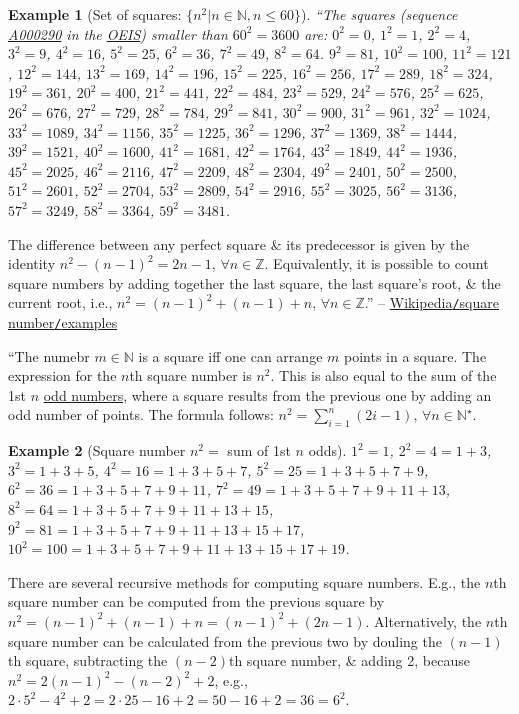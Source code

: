 \documentclass{article}
\newtheorem{example}{Example}
\begin{document}
\begin{example}[Set of squares: $\{n^2|n\in\mathbb{N},n\le60\}$]
	``The squares (sequence \href{https://oeis.org/A000290}{A000290} in the \href{https://en.wikipedia.org/wiki/On-Line_Encyclopedia_of_Integer_Sequences}{OEIS}) smaller than $60^2 = 3600$ are: $0^2 = 0$, $1^2 = 1$, $2^2 = 4$, $3^2 = 9$, $4^2 = 16$, $5^2 = 25$, $6^2 = 36$, $7^2 = 49$, $8^2 = 64$. $9^2 = 81$, $10^2 = 100$, $11^2 = 121$, $12^2 = 144$, $13^2 = 169$, $14^2 = 196$, $15^2 = 225$, $16^2 = 256$, $17^2 = 289$, $18^2 = 324$, $19^2 = 361$, $20^2 = 400$, $21^2 = 441$, $22^2 = 484$, $23^2 = 529$, $24^2 = 576$, $25^2 = 625$, $26^2 =  676$, $27^2 = 729$, $28^2 = 784$, $29^2 = 841$, $30^2 = 900$, $31^2 = 961$, $32^2 = 1024$, $33^2 = 1089$, $34^2 = 1156$, $35^2 = 1225$, $36^2 = 1296$, $37^2 = 1369$, $38^2 = 1444$, $39^2 = 1521$, $40^2 = 1600$, $41^2 = 1681$, $42^2 = 1764$, $43^2 = 1849$, $44^2 = 1936$, $45^2 = 2025$, $46^2 = 2116$, $47^2 = 2209$, $48^2 = 2304$, $49^2 = 2401$, $50^2 = 2500$, $51^2 = 2601$, $52^2 = 2704$, $53^2 = 2809$, $54^2 = 2916$, $55^2 = 3025$, $56^2 = 3136$, $57^2 = 3249$, $58^2 = 3364$, $59^2 = 3481$.
\end{example}
The difference between any perfect square \& its predecessor is given by the identity $n^2 - (n - 1)^2 = 2n - 1$, $\forall n\in\mathbb{Z}$. Equivalently, it is possible to count square numbers by adding together the last square, the last square's root, \& the current root, i.e., $n^2 = (n - 1)^2 + (n - 1) + n$, $\forall n\in\mathbb{Z}$.'' -- \href{https://en.wikipedia.org/wiki/Square_number#Examples}{Wikipedia{\tt/}square number{\tt/}examples}

``The numebr $m\in\mathbb{N}$ is a square iff one can arrange $m$ points in a square. The expression for the $n$th square number is $n^2$. This is also equal to the sum of the 1st $n$ \href{https://en.wikipedia.org/wiki/Parity_(mathematics)}{odd numbers}, where a square results from the previous one by adding an odd number of points. The formula follows: $n^2 = \sum_{i=1}^n (2i - 1)$, $\forall n\in\mathbb{N}^\star$.

\begin{example}[Square number $n^2 =$ sum of 1st $n$ odds]
	$1^2 = 1$, $2^2 = 4 = 1 + 3$, $3^2 = 1 + 3 + 5$, $4^2 = 16 = 1 + 3 + 5 + 7$, $5^2 = 25 = 1 + 3 + 5 + 7 + 9$, $6^2 = 36 = 1 + 3 + 5 + 7 + 9 + 11$, $7^2 = 49 = 1 + 3 + 5 + 7 + 9 + 11 + 13$, $8^2 = 64 = 1 + 3 + 5 + 7 + 9 + 11 + 13 + 15$, $9^2 = 81 = 1 + 3 + 5 + 7 + 9 + 11 + 13 + 15 + 17$, $10^2 = 100 = 1 + 3 + 5 + 7 + 9 + 11 + 13 + 15 + 17 + 19$.
\end{example}
There are several recursive methods for computing square numbers. E.g., the $n$th square number can be computed from the previous square by $n^2 = (n - 1)^2 + (n - 1) + n = (n - 1)^2 + (2n - 1)$. Alternatively, the $n$th square number can be calculated from the previous two by douling the $(n - 1)$th square, subtracting the $(n - 2)$th square number, \& adding 2, because $n^2 = 2(n - 1)^2  - (n - 2)^2 + 2$, e.g., $2\cdot5^2 - 4^2 + 2 = 2\cdot25 - 16 + 2 = 50 - 16 + 2 = 36 = 6^2$.
\end{document}
